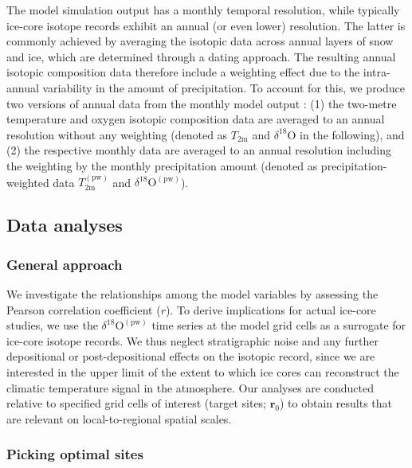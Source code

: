 \documentclass[cp, manuscript]{copernicus}
\begin{document}
The model simulation output has a monthly temporal resolution, while typically
ice-core isotope records exhibit an annual (or even lower) resolution. The
latter is commonly achieved by averaging the isotopic data across annual layers
of snow and ice, which are determined through a dating approach. The resulting
annual isotopic composition data therefore include a weighting effect due to the
intra-annual variability in the amount of precipitation. To account for this, we
produce two versions of annual data from the monthly model output
\citep{Munch2020}: (1) the two-metre temperature and oxygen isotopic composition
data are averaged to an annual resolution without any weighting (denoted as
$T_{2\mathrm{m}}$ and $\delta^{18}\mathrm{O}$ in the following), and (2) the
respective monthly data are averaged to an annual resolution including the
weighting by the monthly precipitation amount (denoted as precipitation-weighted
data $T_{2\mathrm{m}}^{\mathrm{(pw)}}$ and
$\delta^{18}\mathrm{O}^{\mathrm{(pw)}}$).

\subsection{Data analyses}\label{methods:main}

\subsubsection{General approach}\label{methods:general}

We investigate the relationships among the model variables by assessing the
Pearson correlation coefficient ($r$). To derive implications for actual
ice-core studies, we use the $\delta^{18}\mathrm{O}^{\mathrm{(pw)}}$ time series
at the model grid cells as a surrogate for ice-core isotope records. We thus
neglect stratigraphic noise and any further depositional or post-depositional
effects on the isotopic record, since we are interested in the upper limit of
the extent to which ice cores can reconstruct the climatic temperature signal in
the atmosphere. Our analyses are conducted relative to specified grid cells of
interest (target sites; $\mathbf{r}_0$) to obtain results that are relevant on
local-to-regional spatial scales.

\subsubsection{Picking optimal sites}\label{methods:picking}
\end{document}
